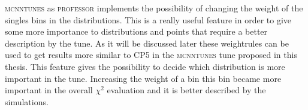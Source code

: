 \textsc{mcnntunes} as \textsc{professor} implements the possibility of changing the weight of the singles bins in the distributions. This is a really useful feature in order to give some more importance to distributions and points that require a better description by the tune. As it will be discussed later these weightrules can be used  to get results more similar to CP5 in the \textsc{mcnntunes} tune proposed in this thesis. 
This feature gives the possibility to decide which distribution is more important in the tune.
Increasing the weight of a bin this bin became more important in the overall $\chi^2$ evaluation and it is better described by the simulations. 
%


